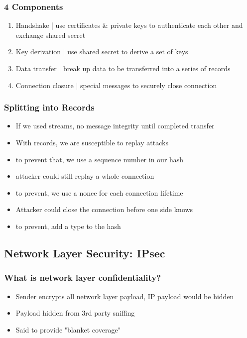 \documentclass{article}
\begin{document}
\subsubsection*{4 Components}

\begin{enumerate}
	\item Handshake | use certificates \& private keys to authenticate each other and exchange shared secret
	\item Key derivation | use shared secret to derive a set of keys
	\item Data transfer | break up data to be transferred into a series of records
	\item Connection closure | special messages to securely close connection
\end{enumerate}

\subsubsection*{Splitting into Records}

\begin{itemize}
	\item If we used streams, no message integrity until completed transfer
	\item With records, we are susceptible to replay attacks
	\item to prevent that, we use a sequence number in our hash
	\item attacker could still replay a whole connection
	\item to prevent, we use a nonce for each connection lifetime
	\item Attacker could close the connection before one side knows
	\item to prevent, add a type to the hash
\end{itemize}

\subsection{Network Layer Security: IPsec}

\subsubsection*{What is network layer confidentiality?}

\begin{itemize}
	\item Sender encrypts all network layer payload, IP payload would be hidden
	\item Payload hidden from 3rd party sniffing
	\item Said to provide "blanket coverage"
\end{itemize}
\end{document}
